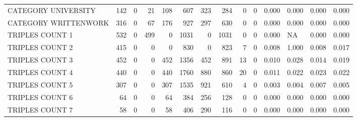 \begin{tabular}{lrrrrrrrrrllll}
 CATEGORY UNIVERSITY      &             142 &             0 &              21 &             108 &             607 &  323 &  284 &    0 &    0 & 0.000 & 0.000 & 0.000 & 0.000 \\
 CATEGORY WRITTENWORK     &             316 &             0 &              67 &             176 &             927 &  297 &  630 &    0 &    0 & 0.000 & 0.000 & 0.000 & 0.000 \\
 TRIPLES COUNT 1          &             532 &             0 &             499 &               0 &            1031 &    0 & 1031 &    0 &    0 & 0.000 & NA    & 0.000 & 0.000 \\
 TRIPLES COUNT 2          &             415 &             0 &               0 &               0 &             830 &    0 &  823 &    7 &    0 & 0.008 & 1.000 & 0.008 & 0.017 \\
 TRIPLES COUNT 3          &             452 &             0 &               0 &             452 &            1356 &  452 &  891 &   13 &    0 & 0.010 & 0.028 & 0.014 & 0.019 \\
 TRIPLES COUNT 4          &             440 &             0 &               0 &             440 &            1760 &  880 &  860 &   20 &    0 & 0.011 & 0.022 & 0.023 & 0.022 \\
 TRIPLES COUNT 5          &             307 &             0 &               0 &             307 &            1535 &  921 &  610 &    4 &    0 & 0.003 & 0.004 & 0.007 & 0.005 \\
 TRIPLES COUNT 6          &              64 &             0 &               0 &              64 &             384 &  256 &  128 &    0 &    0 & 0.000 & 0.000 & 0.000 & 0.000 \\
 TRIPLES COUNT 7          &              58 &             0 &               0 &              58 &             406 &  290 &  116 &    0 &    0 & 0.000 & 0.000 & 0.000 & 0.000 \\
\hline
\end{tabular}